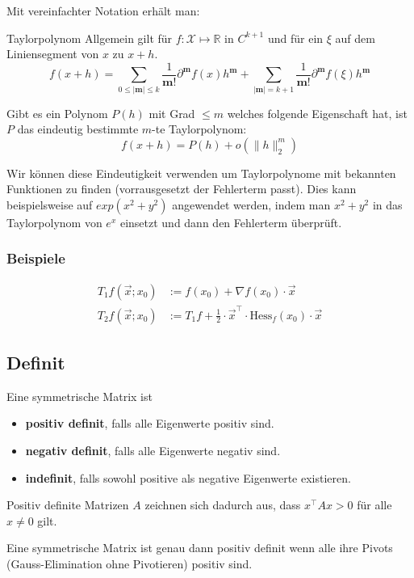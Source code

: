 \documentclass[a4paper,10pt]{article}
\def\R{\mathbb{R}}
\def\X{\mathcal{X}}
\begin{document}
Mit vereinfachter Notation erhält man:

\begin{mainbox}{Taylorpolynom}
  Allgemein gilt für $f: \X \mapsto \R$ in $C^{k+1}$ und für ein $\xi$ auf dem Liniensegment von $x$ zu $x + h$.
  $$f(x + h) = \sum_{0 \leq | \mathbf{m} | \leq k} \frac{1}{\mathbf{m}!} \partial^\mathbf{m} f(x) h^\mathbf{m} + \sum_{| \mathbf{m}| = k + 1} \frac{1}{\mathbf{m}!} \partial^\mathbf{m} f(\xi) h^\mathbf{m}$$
\end{mainbox}

Gibt es ein Polynom $P(h)$ mit Grad $\leq m$ welches folgende Eigenschaft hat, ist $P$ das eindeutig bestimmte $m$-te Taylorpolynom:
$$f(x + h) = P(h) + o(\lVert h \rVert_2^m)$$

Wir können diese Eindeutigkeit verwenden um Taylorpolynome mit bekannten Funktionen zu finden (vorrausgesetzt der Fehlerterm passt). Dies kann beispielsweise auf $exp(x^2 + y^2)$ angewendet werden, indem man $x^2 + y^2$ in das Taylorpolynom von $e^x$ einsetzt und dann den Fehlerterm überprüft.

\subsubsection*{Beispiele}
\begin{align*}
  T_1 f(\vec{x}; x_0) &:= f(x_0) + \nabla f(x_0) \cdot \vec{x} \\
  T_2 f(\vec{x}; x_0) &:= T_1f + \frac{1}{2} \cdot \vec{x}^\top \cdot \text{Hess}_f(x_0) \cdot \vec{x}
\end{align*}

\subsection{Definit}
Eine symmetrische Matrix ist
\begin{itemize}
  \item \textbf{positiv definit}, falls alle Eigenwerte positiv sind.
  \item \textbf{negativ definit}, falls alle Eigenwerte negativ sind.
  \item \textbf{indefinit}, falls sowohl positive als negative Eigenwerte existieren.
\end{itemize}

Positiv definite Matrizen $A$ zeichnen sich dadurch aus, dass $x^\top A x > 0$ für alle $x \neq 0$ gilt.

Eine symmetrische Matrix ist genau dann positiv definit wenn alle ihre Pivots (Gauss-Elimination ohne Pivotieren) positiv sind.
\end{document}
